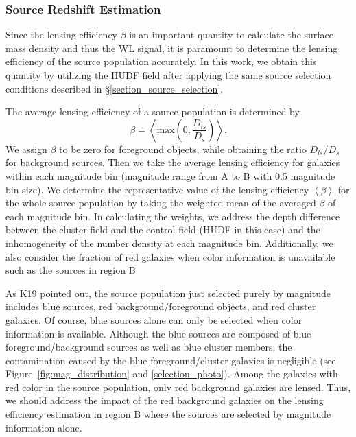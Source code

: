 \documentclass[twocolumn]{aastex631}
\begin{document}
\subsubsection{Source Redshift Estimation} \label{selection_beta}
Since the lensing efficiency $\beta$ is an important quantity to calculate the surface mass density and thus the WL signal, it is paramount to determine the lensing efficiency of the source population accurately. 
In this work, we obtain this quantity by utilizing the HUDF field after applying the same source selection conditions described in \S\ref{section_source_selection}. 


The average lensing efficiency of a source population is determined by
\begin{equation}
\beta = \left < \mbox{max} \left (0,\frac{D_{ls}}{D_s} \right ) \right >. 
\end{equation}
\noindent
We assign $\beta$ to be zero for foreground objects, while obtaining the ratio $D_{ls} / D_{s}$ for background sources. 
Then we take the average lensing efficiency for galaxies within each magnitude bin (magnitude range from A to B with 0.5 magnitude bin size). 
We determine the representative value of the lensing efficiency $\left < \beta \right >$ for the whole source population by taking the weighted mean of the averaged $\beta$ of each magnitude bin. 
In calculating the weights, we address the depth difference between the cluster field and the control field (HUDF in this case) and the inhomogeneity of the number density at each magnitude bin. 
Additionally, we also consider the fraction of red galaxies when color information is unavailable such as the sources in region B. 


As K19 pointed out, the source population just selected purely by magnitude includes blue sources, red background/foreground objects, and red cluster galaxies. 
Of course, blue sources alone can only be selected when color information is available. Although the blue sources are composed of blue foreground/background sources as well as blue cluster members, the contamination caused by the blue foreground/cluster galaxies is negligible (see Figure~\ref{fig:mag_distribution} and \textsection\ref{selection_photo}). 
Among the galaxies with red color in the source population, only red background galaxies are lensed. Thus, we should address the impact of the red background galaxies on the lensing efficiency estimation in region B where the sources are selected by magnitude information alone.
\end{document}
